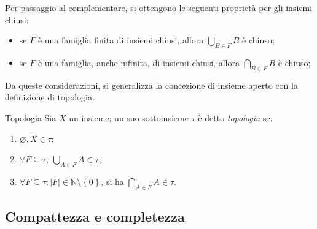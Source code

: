 \documentclass[11pt, a4paper]{scrartcl}
\theoremstyle{definition}
\numberwithin{esempio}{section}
\theoremstyle{definition}
\numberwithin{obs}{section}
\numberwithin{nota}{section}
\numberwithin{equation}{subsection}
\begin{document}
\noindent Per passaggio al complementare, si ottengono le seguenti propriet\`a per gli insiemi chiusi:
\begin{itemize}
	\item se $F$ \`e una famiglia finita di insiemi chiusi, allora $\bigcup _{B \in F}  B $ \`e chiuso;
	\item se $F$ \`e una famiglia, anche infinita, di insiemi chiusi, allora $\bigcap _{B \in F}  B $ \`e chiuso;
\end{itemize}
Da queste considerazioni, si generalizza la concezione di insieme aperto con la definizione di topologia.
\begin{definizione}
	{Topologia}{}
	Sia $X$ un insieme; un suo sottoinsieme $\tau $ \`e detto \textit{topologia} se:
	\begin{enumerate}[(T1).]
		\item $\varnothing,X \in \tau $;
		\item $\forall F\subseteq \tau , \ \bigcup_{A \in F} A \in \tau $;
		\item $\forall F\subseteq \tau : \lvert F \rvert \in \mathbb{N} \setminus \left\{ 0 \right\} $, si ha $\bigcap_{A \in F} A \in \tau $.
	\end{enumerate}
\end{definizione}
\subsection{Compattezza e completezza}
\end{document}
